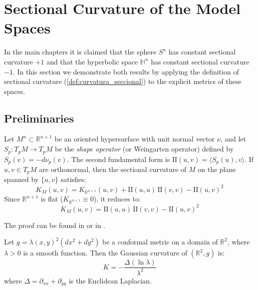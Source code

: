\section{Sectional Curvature of the Model Spaces}\label{sec:curvatura_espacios_modelo}

In the main chapters it is claimed that the sphere $S^n$ has constant sectional curvature $+1$ and that the hyperbolic space $\mathbb{H}^n$ has constant sectional curvature $-1$. In this section we demonstrate both results by applying the definition of sectional curvature (\autoref{def:curvatura_seccional}) to the explicit metrics of these spaces.

\subsection{Preliminaries}\label{subsec:curvatura_espacios_preliminares}

\begin{lemma}\label{lem:ecuacion_gauss}
Let $M^n \subset \mathbb{R}^{n+1}$ be an oriented hypersurface with unit normal vector $\nu$, and let $S_p: T_pM \to T_pM$ be the \textit{shape operator} (or Weingarten operator) defined by $S_p(v) = -d\nu_p(v)$. The second fundamental form is $\mathrm{II}(u, v) = \langle S_p(u), v \rangle$. If $u, v \in T_pM$ are orthonormal, then the sectional curvature of $M$ on the plane spanned by $\{u, v\}$ satisfies:
\begin{equation}\label{eq:ecuacion_gauss}
K_M(u,v) = K_{\mathbb{R}^{n+1}}(u,v) + \mathrm{II}(u,u)\,\mathrm{II}(v,v) - \mathrm{II}(u,v)^2
\end{equation}
Since $\mathbb{R}^{n+1}$ is flat ($K_{\mathbb{R}^{n+1}} \equiv 0$), it reduces to:
\begin{equation}\label{eq:gauss_simplificada}
K_M(u,v) = \mathrm{II}(u,u)\,\mathrm{II}(v,v) - \mathrm{II}(u,v)^2
\end{equation}
\end{lemma}

The proof can be found in \citet[Theorem~8.4]{lee2018introduction} or in \citet[Chapter~3, Proposition~4]{do1976differential}.

\begin{lemma}\label{lem:curvatura_conforme_2d}
Let $g = \lambda(x,y)^2(dx^2 + dy^2)$ be a conformal metric on a domain of $\mathbb{R}^2$, where $\lambda > 0$ is a smooth function. Then the Gaussian curvature of $(\mathbb{R}^2, g)$ is:
\begin{equation}\label{eq:curvatura_conforme}
K = -\frac{\Delta(\ln \lambda)}{\lambda^2}
\end{equation}
where $\Delta = \partial_{xx} + \partial_{yy}$ is the Euclidean Laplacian.
\end{lemma}

